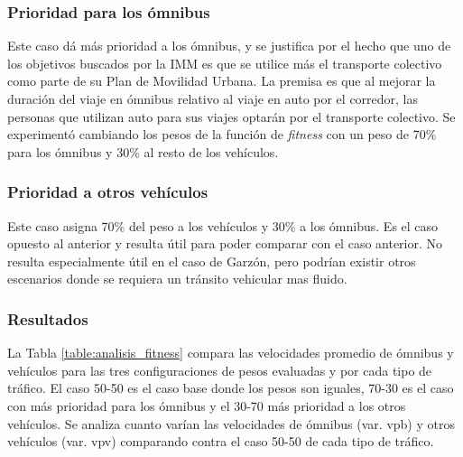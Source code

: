 \subsubsection{Prioridad para los ómnibus}
Este caso dá más prioridad a los ómnibus, y se justifica por el hecho que uno de los objetivos buscados por la IMM es que se utilice más el transporte colectivo como parte de su Plan de Movilidad Urbana. La premisa es que al mejorar la duración del viaje en ómnibus relativo al viaje en auto por el corredor, las personas que utilizan auto para sus viajes optarán por el transporte colectivo. Se experimentó cambiando los pesos de la función de \emph{fitness} con un peso de 70\% para los ómnibus y 30\% al resto de los vehículos.


\subsubsection{Prioridad a otros vehículos}

Este caso asigna 70\% del peso a los vehículos y 30\% a los ómnibus. Es el caso opuesto al anterior y resulta útil para poder comparar con el caso anterior. No resulta especialmente útil en el caso de Garzón, pero podrían existir otros escenarios donde se requiera un tránsito vehicular mas fluido.

\subsubsection{Resultados}

La Tabla \ref{table:analisis_fitness} compara las velocidades promedio de ómnibus y vehículos para las tres configuraciones de pesos evaluadas y por cada tipo de tráfico.  El caso 50-50 es el caso base donde los pesos son iguales, 70-30 es el caso con más prioridad para los ómnibus y el 30-70 más prioridad a los otros vehículos. Se analiza cuanto varían las velocidades de ómnibus (var. vpb) y otros vehículos (var. vpv) comparando contra el caso 50-50 de cada tipo de tráfico.


